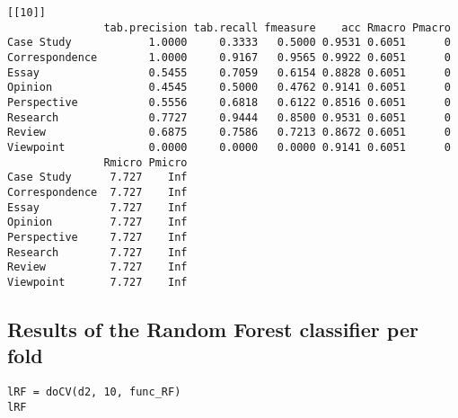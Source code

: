 \documentclass[]{article}
\begin{document}
\begin{lstlisting}[frame=single]
[[10]]
               tab.precision tab.recall fmeasure    acc Rmacro Pmacro
Case Study            1.0000     0.3333   0.5000 0.9531 0.6051      0
Correspondence        1.0000     0.9167   0.9565 0.9922 0.6051      0
Essay                 0.5455     0.7059   0.6154 0.8828 0.6051      0
Opinion               0.4545     0.5000   0.4762 0.9141 0.6051      0
Perspective           0.5556     0.6818   0.6122 0.8516 0.6051      0
Research              0.7727     0.9444   0.8500 0.9531 0.6051      0
Review                0.6875     0.7586   0.7213 0.8672 0.6051      0
Viewpoint             0.0000     0.0000   0.0000 0.9141 0.6051      0
               Rmicro Pmicro
Case Study      7.727    Inf
Correspondence  7.727    Inf
Essay           7.727    Inf
Opinion         7.727    Inf
Perspective     7.727    Inf
Research        7.727    Inf
Review          7.727    Inf
Viewpoint       7.727    Inf
\end{lstlisting}

\subsection{Results of the Random Forest classifier per fold}

\begin{lstlisting}[frame=single]
lRF = doCV(d2, 10, func_RF)
lRF
\end{lstlisting}
\end{document}
